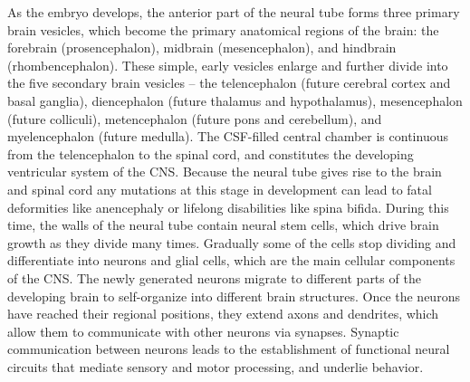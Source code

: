 As the embryo develops, the anterior part of the neural tube forms three primary brain vesicles, which become the primary anatomical regions of the brain: the forebrain (prosencephalon), midbrain (mesencephalon), and hindbrain (rhombencephalon). These simple, early vesicles enlarge and further divide into the five secondary brain vesicles -- the telencephalon (future cerebral cortex and basal ganglia), diencephalon (future thalamus and hypothalamus), mesencephalon (future colliculi), metencephalon (future pons and cerebellum), and myelencephalon (future medulla). The CSF-filled central chamber is continuous from the telencephalon to the spinal cord, and constitutes the developing ventricular system of the CNS. Because the neural tube gives rise to the brain and spinal cord any mutations at this stage in development can lead to fatal deformities like anencephaly or lifelong disabilities like spina bifida. During this time, the walls of the neural tube contain neural stem cells, which drive brain growth as they divide many times. Gradually some of the cells stop dividing and differentiate into neurons and glial cells, which are the main cellular components of the CNS. The newly generated neurons migrate to different parts of the developing brain to self-organize into different brain structures. Once the neurons have reached their regional positions, they extend axons and dendrites, which allow them to communicate with other neurons via synapses. Synaptic communication between neurons leads to the establishment of functional neural circuits that mediate sensory and motor processing, and underlie behavior.



